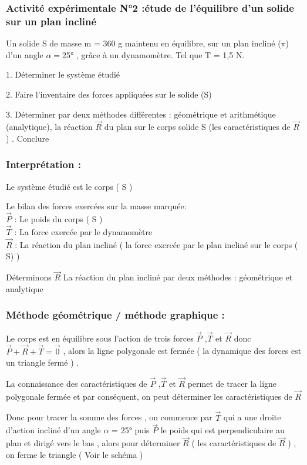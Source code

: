\documentclass[12pt]{article}
\begin{document}
\subsubsection{Activité expérimentale N°2 :étude de l’équilibre d’un solide sur un plan incliné  }

 Un solide S de masse m = 360 g maintenu en équilibre, sur un plan incliné ($\pi$) d’un angle $\alpha = $25° , grâce à un dynamomètre. Tel que T = 1,5 N.
 
 1. Déterminer le système étudié
 
 2. Faire l’inventaire des forces appliquées sur le solide (S)

 3. Déterminer par deux méthodes différentes : géométrique et
arithmétique (analytique), la réaction $\vec{R}$ du plan sur le corps solide S
(les caractéristiques de $\vec{R}$ ) . Conclure

\subsubsection{Interprétation : }

Le système étudié est le corps ( S )

Le bilan des forces exercées sur la masse marquée:
\\$\vec{P}$ : Le poids du corps ( S )
\\$\vec{T}$ : La force exercée par le dynamomètre
\\$\vec{R}$ : La réaction du plan incliné ( la force exercée par le plan incliné sur le corps ( S) )

Déterminons $\vec{R}$ La réaction du plan incliné par deux méthodes : géométrique et analytique

\subsubsection{Méthode géométrique / méthode graphique : }
Le corps est en équilibre sous l’action de trois forces $\vec{P}$ ,$\vec{T}$ et $\vec{R}$ donc $\vec{P} + \vec{R} + \vec{T} = \vec{0}$ ,
 alors la ligne polygonale est fermée ( la dynamique des forces est un triangle fermé ) .

La connaissance des caractéristiques de $\vec{P}$ ,$\vec{T}$ et $\vec{R}$  permet de tracer la ligne polygonale fermée et par
conséquent, on peut déterminer les caractéristiques de $\vec{R}$

Donc pour tracer la somme des forces , on commence par $\vec{T}$ qui a une droite d’action incliné d’un angle
$\alpha$ = 25° puis $\vec{P}$ le poids qui est perpendiculaire au plan  et dirigé vers le bas , alors pour déterminer $\vec{R}$
( les caractéristiques de $\vec{R}$ ) , on ferme le triangle ( Voir le schéma )
 
\end{document}
